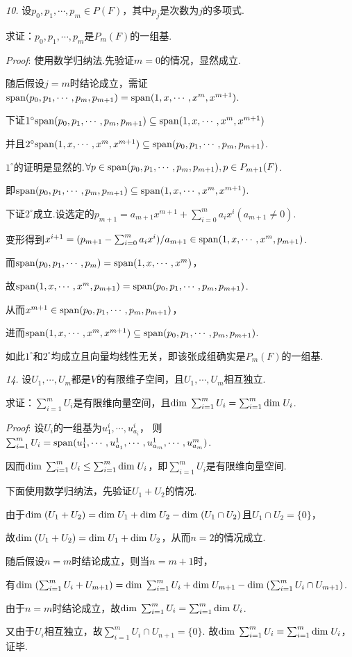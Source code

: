 \textit{10.}
设$p_0,p_1,\cdots,p_m\in P(F)$，其中$p_j$是次数为$j$的多项式.

求证：$p_0,p_1,\cdots,p_m$是$P_m(F)$的一组基.

\textit{Proof}:
使用数学归纳法.先验证$m=0$的情况，显然成立.

随后假设$j=m$时结论成立，需证$\mathrm{span} (p_0,p_1,\cdots,p_m,p_{m+1})=\mathrm{span} (1,x,\cdots,x^m,x^{m+1})$.

下证$1^{\circ}\mathrm{span} (p_0,p_1,\cdots,p_m,p_{m+1}) \subseteq \mathrm{span} (1,x,\cdots,x^m,x^{m+1})$

并且$2^{\circ}\mathrm{span} (1,x,\cdots,x^m,x^{m+1}) \subseteq \mathrm{span} (p_0,p_1,\cdots,p_m,p_{m+1})$.

$1^{\circ}$的证明是显然的.$\forall p\in \mathrm{span} (p_0,p_1,\cdots,p_m,p_{m+1}),p\in P_{m+1}(F)$.

即$\mathrm{span} (p_0,p_1,\cdots,p_m,p_{m+1})\subseteq \mathrm{span} (1,x,\cdots,x^m,x^{m+1})$.

下证$2^{\circ}$成立.设选定的$p_{m+1}=a_{m+1}x^{m+1}+\sum_{i=0}^m a_ix^i(a_{m+1} \ne 0)$.

变形得到$x^{i+1}=(p_{m+1}-\sum_{i=0}^m a_ix^i)/a_{m+1} \in \mathrm{span} (1,x,\cdots,x^m,p_{m+1})$.

而$\mathrm{span} (p_0,p_1,\cdots,p_m)=\mathrm{span} (1,x,\cdots,x^m)$，

故$\mathrm{span} (1,x,\cdots,x^m,p_{m+1})=\mathrm{span} (p_0,p_1,\cdots,p_m,p_{m+1})$.

从而$x^{m+1}\in \mathrm{span} (p_0,p_1,\cdots,p_m,p_{m+1})$，

进而$\mathrm{span} (1,x,\cdots,x^m,x^{m+1}) \subseteq \mathrm{span} (p_0,p_1,\cdots,p_m,p_{m+1})$.

如此$1^{\circ}$和$2^{\circ}$均成立且向量均线性无关，即该张成组确实是$P_m(F)$的一组基.

\hspace*{\fill}

\textit{14.}
设$U_1,\cdots,U_m$都是$V$的有限维子空间，且$U_1,\cdots,U_m$相互独立.

求证：$\sum_{i=1}^m U_i$是有限维向量空间，且$\mathrm{dim \;} \sum_{i=1}^m U_i=\sum_{i=1}^m \mathrm{dim \;} U_i$.

\textit{Proof}:
设$U_i$的一组基为$u_1^i,\cdots,u_{a_i}^i$，
则$\sum_{i=1}^m U_i=\mathrm{span}(u_1^1,\cdots,u_{a_1}^1,\cdots,u_{a_m}^1,\cdots,u_{a_m}^m)$.

因而$\mathrm{dim \;} \sum_{i=1}^m U_i \leq \sum_{i=1}^m \mathrm{dim \;} U_i$，即$\sum_{i=1}^m U_i$是有限维向量空间.

下面使用数学归纳法，先验证$U_1+U_2$的情况.

由于$\mathrm{dim \;} (U_1+U_2)=\mathrm{dim \;} U_1+\mathrm{dim \;} U_2-\mathrm{dim \;} (U_1\cap U_2)$且$U_1\cap U_2=\{0\}$，

故$\mathrm{dim \;} (U_1+U_2)=\mathrm{dim \;} U_1+\mathrm{dim \;} U_2$，从而$n=2$的情况成立.

随后假设$n=m$时结论成立，则当$n=m+1$时，

有$\mathrm{dim \;} (\sum_{i=1}^m U_i+U_{m+1})=\mathrm{dim \;} \sum_{i=1}^m U_i+\mathrm{dim \;} U_{m+1}-\mathrm{dim \;} (\sum_{i=1}^m U_i \cap U_{m+1})$.

由于$n=m$时结论成立，故$\mathrm{dim \;} \sum_{i=1}^m U_i=\sum_{i=1}^m \mathrm{dim \;} U_i$.

又由于$U_i$相互独立，故$\sum_{i=1}^m U_i \cap U_{n+1}=\{0\}$.
故$\mathrm{dim \;} \sum_{i=1}^m U_i=\sum_{i=1}^m \mathrm{dim \;} U_i$，证毕.

